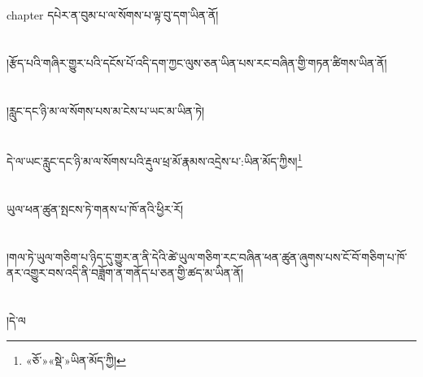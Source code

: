 chapter{ }དཔེར་ན་བུམ་པ་ལ་སོགས་པ་ལྟ་བུ་དག་ཡིན་ནོ།\chapter{ }།རྩོད་པའི་གཞིར་གྱུར་པའི་དངོས་པོ་འདི་དག་ཀྱང་ལུས་ཅན་ཡིན་པས་རང་བཞིན་གྱི་གཏན་ཚིགས་ཡིན་ནོ།\chapter{ }།རླུང་དང་ཉི་མ་ལ་སོགས་པས་མ་ངེས་པ་ཡང་མ་ཡིན་ཏེ།\chapter{ }དེ་ལ་ཡང་རླུང་དང་ཉི་མ་ལ་སོགས་པའི་རྡུལ་ཕྲ་མོ་རྣམས་འདྲེས་པ་:ཡིན་མོད་ཀྱིས།\footnote{«ཅོ་»«སྡེ་»ཡིན་མོད་ཀྱི།}\chapter{ }ཡུལ་ཕན་ཚུན་སྤངས་ཏེ་གནས་པ་ཁོ་ནའི་ཕྱིར་རོ།\chapter{ }།གལ་ཏེ་ཡུལ་གཅིག་པ་ཉིད་དུ་གྱུར་ན་ནི་དེའི་ཚེ་ཡུལ་གཅིག་རང་བཞིན་ཕན་ཚུན་ཞུགས་པས་ངོ་བོ་གཅིག་པ་ཁོ་ནར་འགྱུར་བས་འདི་ནི་བཟློག་ན་གནོད་པ་ཅན་གྱི་ཚད་མ་ཡིན་ནོ།\chapter{ }།དེ་ལ